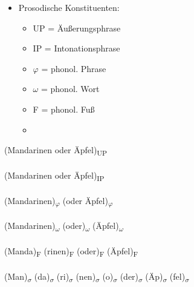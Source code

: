 
\begin{frame}


\begin{itemize}
	\item Prosodische Konstituenten:
	\begin{multicols}{2}
	\begin{itemize}
		\item UP = Äußerungsphrase
		\item IP = Intonationsphrase
		\item $\varphi$ = phonol. Phrase
\columnbreak
		\item $\omega$ = phonol. Wort
		\item F = phonol. Fuß
		\item {}
	\end{itemize}
	\end{multicols}
\end{itemize}

\begin{minipage}{0.39\textwidth}
	\begin{figure}
	\centering
		\caption{\cite{Fuhrhop&Co13a}}
	\end{figure}
\end{minipage}\hfill%
\begin{minipage}{0.6\textwidth}
	\footnotesize{(Mandarinen oder Äpfel)\textsubscript{UP}\\
	\\
	(Mandarinen oder Äpfel)\textsubscript{IP}\\
	\\
	(Mandarinen)\textsubscript{$\varphi$} (oder Äpfel)\textsubscript{$\varphi$}\\
	\\
	(Mandarinen)\textsubscript{$\omega$} (oder)\textsubscript{$\omega$} (Äpfel)\textsubscript{$\omega$}\\
	\\
	(Manda)\textsubscript{F} (rinen)\textsubscript{F} (oder)\textsubscript{F} (Äpfel)\textsubscript{F} \\
	\\
	(Man)\textsubscript{$\sigma$} (da)\textsubscript{$\sigma$} (ri)\textsubscript{$\sigma$} (nen)\textsubscript{$\sigma$} (o)\textsubscript{$\sigma$} (der)\textsubscript{$\sigma$} (Äp)\textsubscript{$\sigma$} (fel)\textsubscript{$\sigma$}
}
\vspace{1cm}
\end{minipage}



\end{frame}
